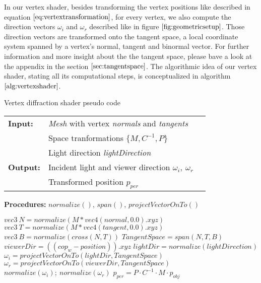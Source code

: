 In our vertex shader, besides transforming the vertex positions like described in equation $\ref{eq:vertextransformation}$, for every vertex, we also compute the direction vectors $\omega_i$ and $\omega_r$ described like in figure $\ref{fig:geometricsetup}$. Those direction vectors are transformed onto the tangent space, a local coordinate system spanned by a vertex's normal, tangent and binormal vector. For further information and more insight about the the tangent space, please bave a look at the appendix in the section $\ref{sec:tangentspace}$. The algorithmic idea of our vertex shader, stating all its computational steps, is conceptualized in algorithm $\ref{alg:vertexshader}$.
  \emph{}
\begin{algorithm}[H]
\caption{Vertex diffraction shader pseudo code}
\begin{table}[H]
  \begin{tabular}{@{}lll@{}}
    \textbf{Input:} & \emph{Mesh} with vertex \emph{normals} and \emph{tangents}  \\
    & Space tranformations $\{M, C^{-1}, P\}$  \\
    & Light direction \emph{lightDirection}  \\
    \textbf{Output:} & Incident light and viewer direction $\omega_i,\ \omega_r$ \\
    & Transformed position $p_{per}$ \\
  \end{tabular} 
\end{table}
\textbf{Procedures:} $normalize()$, $span()$, $projectVectorOnTo()$  \\
\setlength{\fboxrule}{0pt} 
\begin{boxedminipage}{1.0\textwidth}
  \begin{algorithmic}[1]
        \State $ vec3 \ N = normalize(M * vec4(normal,0.0).xyz)$
        \State $ vec3 \ T = normalize(M * vec4(tangent,0.0).xyz)$
        \State $ vec3 \ B = normalize(cross(N, T))$
        \State $ TangentSpace = span(N, T, B)$
        \State $ viewerDir = ((cop_{w}-position)).xyz$
        \State $ lightDir = normalize(lightDirection)$
        \State $ \omega_i = projectVectorOnTo(lightDir, TangentSpace)$
        \State $ \omega_r = projectVectorOnTo(viewerDir, TangentSpace)$
        \State $normalize(\omega_i); \ normalize(\omega_r)$
        \State $p_{per} = P \cdot C^{-1} \cdot M \cdot p_{obj}$
      \EndFor
  \end{algorithmic}
  \end{boxedminipage}
  \vskip1.5pt
\label{alg:vertexshader}
\end{algorithm}

